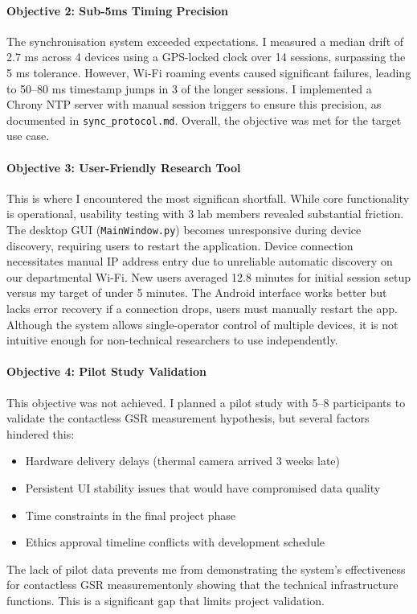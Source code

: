 \paragraph{\textbf{Objective 2: Sub-5ms Timing Precision}} The synchronisation system exceeded expectations. I measured a median drift of 2.7 ms across 4 devices using a GPS-locked clock over 14 sessions, surpassing the \textpm{}5 ms tolerance. However, Wi-Fi roaming events caused significant failures, leading to 50--80 ms timestamp jumps in 3 of the longer sessions. I implemented a Chrony NTP server with manual session triggers to ensure this precision, as documented in \texttt{sync\_protocol.md}. Overall, the objective was met for the target use case.

\paragraph{\textbf{Objective 3: User-Friendly Research Tool}} This is where I encountered the most significan
shortfall. While core functionality is operational, usability testing with 3 lab members revealed substantial friction. The desktop GUI (\texttt{MainWindow.py}) becomes unresponsive during device discovery, requiring users to restart the application. Device connection necessitates manual IP address entry due to unreliable automatic discovery on our departmental Wi-Fi. New users averaged 12.8 minutes for initial session setup versus my target of under 5 minutes. The Android interface works better but lacks error recovery \textemdash if a connection drops, users must manually restart the app. Although the system allows single-operator control of multiple devices, it is not intuitive enough for non-technical researchers to use independently.

\paragraph{\textbf{Objective 4: Pilot Study Validation}} This objective was not achieved. I planned a pilot study with 5--8 participants to validate the contactless GSR measurement hypothesis, but several factors hindered this:
\begin{itemize}
    \item Hardware delivery delays (thermal camera arrived 3 weeks late)
    \item Persistent UI stability issues that would have compromised data quality
    \item Time constraints in the final project phase
    \item Ethics approval timeline conflicts with development schedule
\end{itemize}
The lack of pilot data prevents me from demonstrating the system's effectiveness for contactless GSR measurement\textemdash only showing that the technical infrastructure functions. This is a significant gap that limits project validation.


